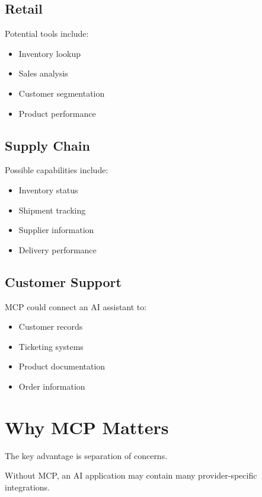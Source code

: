 \documentclass[11pt,a4paper]{article}
\begin{document}
\subsection{Retail}

Potential tools include:

\begin{itemize}
\item Inventory lookup
\item Sales analysis
\item Customer segmentation
\item Product performance
\end{itemize}

\subsection{Supply Chain}

Possible capabilities include:

\begin{itemize}
\item Inventory status
\item Shipment tracking
\item Supplier information
\item Delivery performance
\end{itemize}

\subsection{Customer Support}

MCP could connect an AI assistant to:

\begin{itemize}
\item Customer records
\item Ticketing systems
\item Product documentation
\item Order information
\end{itemize}

\section{Why MCP Matters}

The key advantage is separation of concerns.

Without MCP, an AI application may contain many provider-specific
integrations.
\end{document}
